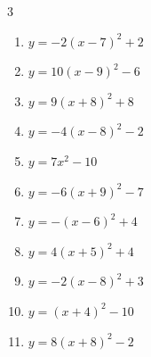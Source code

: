 \begin{multicols}{3}
\begin{enumerate}
        \phantom{$\displaystyle 頂点\left( -8 , -9 \right)$}

  \item $\displaystyle y=-2\left( x-7\right)^{2}+2$

        \phantom{$\displaystyle 頂点\left( 7 , 2 \right)$}

  \item $\displaystyle y=10\left( x-9\right)^{2}-6$

        \phantom{$\displaystyle 頂点\left( 9 , -6 \right)$}

\columnbreak %

  \item $\displaystyle y=9\left( x+8\right)^{2}+8$

        \phantom{$\displaystyle 頂点\left( -8 , 8 \right)$}

  \item $\displaystyle y=-4\left( x-8\right)^{2}-2$

        \phantom{$\displaystyle 頂点\left( 8 , -2 \right)$}

  \item $\displaystyle y=7x^{2}-10$

        \phantom{$\displaystyle 頂点\left( 0 , -10 \right)$}

  \item $\displaystyle y=-6\left( x+9\right)^{2}-7$

        \phantom{$\displaystyle 頂点\left( -9 , -7 \right)$}

  \item $\displaystyle y=-\left( x-6\right)^{2}+4$

        \phantom{$\displaystyle 頂点\left( 6 , 4 \right)$}

  \item $\displaystyle y=4\left( x+5\right)^{2}+4$

        \phantom{$\displaystyle 頂点\left( -5 , 4 \right)$}

  \item $\displaystyle y=-2\left( x-8\right)^{2}+3$

        \phantom{$\displaystyle 頂点\left( 8 , 3 \right)$}

  \item $\displaystyle y=\left( x+4\right)^{2}-10$

        \phantom{$\displaystyle 頂点\left( -4 , -10 \right)$}

  \item $\displaystyle y=8\left( x+8\right)^{2}-2$


\end{enumerate}
\end{multicols}

